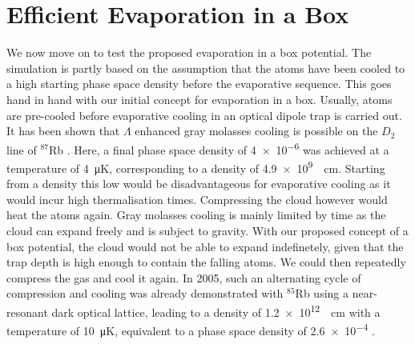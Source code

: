 

\section{Efficient Evaporation in a Box}
We now move on to test the proposed evaporation in a box potential. The simulation is partly based on the assumption that the atoms have been cooled to a high starting phase space density before the evaporative sequence. This goes hand in hand with our initial concept for evaporation in a box. Usually, atoms are pre-cooled before evaporative cooling in an optical dipole trap is carried out. It has been shown that $\Lambda$ enhanced gray molasses cooling is possible on the $D_2$ line of $^{87}$Rb \cite{Rosi2018enhancedGM}. Here, a final phase space density of \num{4e-6} was achieved at a temperature of \SI{4}{\micro\kelvin}, corresponding to a density of \SI{4.9e9}{\per\centi\meter}. Starting from a density this low would be disadvantageous for evaporative cooling as it would incur high thermalisation times. Compressing the cloud however would heat the atoms again. Gray molasses cooling is mainly limited by time as the cloud can expand freely and is subject to gravity. With our proposed concept of a box potential, the cloud would not be able to expand indefinetely, given that the trap depth is high enough to contain the falling atoms. We could then repeatedly compress the gas and cool it again. In 2005, such an alternating cycle of compression and cooling was already demonstrated with $^{85}$Rb using a near-resonant dark optical lattice, leading to a density of \SI{1.2e12}{\per\centi\meter} with a temperature of \SI{10}{\micro\kelvin}, equivalent to a phase space density of \num{2.6e-4} \cite{PhysRevA.72.043410}. 

